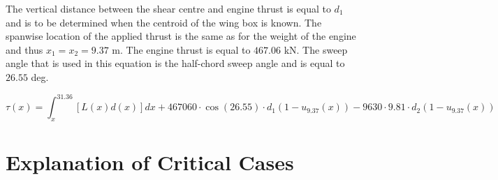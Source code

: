 \noindent The vertical distance between the shear centre and engine thrust is equal to $d_1$ and is to be determined when the centroid of the wing box is known. The spanwise location of the applied thrust is the same as for the weight of the engine and thus $x_1 = x_2 = 9.37$ m. The engine thrust is equal to $467.06$ kN. The sweep angle that is used in this equation is the half-chord sweep angle and is equal to $26.55$ deg.

\begin{equation}
    \tau(x) = \int_x^{31.36}[L(x)d(x)]dx + 467060 \cdot \cos{(26.55)} \cdot d_1 \left(1 - u_{9.37}(x) \right) - 9630 \cdot 9.81 \cdot d_2\left(1 - u_{9.37}(x) \right)
    \label{eq:torsional_distribution_with_numbers}
\end{equation}

\section{Explanation of Critical Cases} \label{sec:fd_critical_cases}

